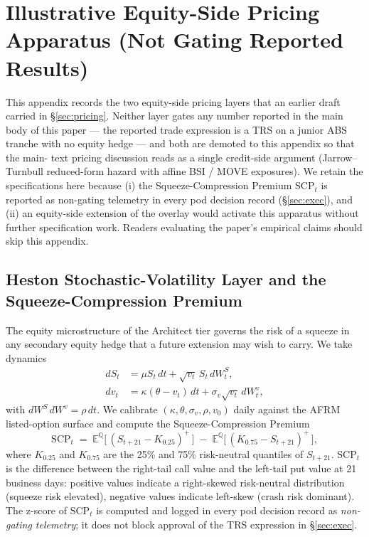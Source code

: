 \documentclass[11pt,letterpaper]{article}
\newcommand{\scp}{\text{SCP}}
\begin{document}
\section{Illustrative Equity-Side Pricing Apparatus (Not Gating Reported Results)}
\label{app:pricing-equity}

This appendix records the two equity-side pricing layers that an
earlier draft carried in \S\ref{sec:pricing}. Neither layer gates
any number reported in the main body of this paper --- the reported
trade expression is a TRS on a junior ABS tranche with no equity
hedge --- and both are demoted to this appendix so that the main-
text pricing discussion reads as a single credit-side argument
(Jarrow--Turnbull reduced-form hazard with affine BSI / MOVE
exposures). We retain the specifications here because (i) the
Squeeze-Compression Premium $\scp_t$ is reported as non-gating
telemetry in every pod decision record (\S\ref{sec:exec}), and (ii)
an equity-side extension of the overlay would activate this
apparatus without further specification work. Readers evaluating
the paper's empirical claims should skip this appendix.

\subsection{Heston Stochastic-Volatility Layer and the Squeeze-Compression Premium}
\label{app:heston}

The equity microstructure of the Architect tier governs the risk of
a squeeze in any secondary equity hedge that a future extension may
wish to carry. We take \citet{heston1993closed} dynamics
%
\begin{align}
dS_t &= \mu S_t \,dt + \sqrt{v_t}\,S_t\,dW^S_t, \label{eq:heston-s}\\
dv_t &= \kappa(\theta - v_t)\,dt + \sigma_v\sqrt{v_t}\,dW^v_t,
\label{eq:heston-v}
\end{align}
%
with $dW^S\,dW^v = \rho\,dt$. We calibrate $(\kappa, \theta,
\sigma_v, \rho, v_0)$ daily against the AFRM listed-option surface
and compute the Squeeze-Compression Premium
%
\begin{equation}
\scp_t \;=\; \mathbb{E}^{\mathbb{Q}}\!\bigl[\,(S_{t+21} - K_{0.25})^+\,\bigr]
\;-\;
\mathbb{E}^{\mathbb{Q}}\!\bigl[\,(K_{0.75} - S_{t+21})^+\,\bigr],
\label{eq:scp}
\end{equation}
%
where $K_{0.25}$ and $K_{0.75}$ are the 25\% and 75\% risk-neutral
quantiles of $S_{t+21}$. $\scp_t$ is the difference between the
right-tail call value and the left-tail put value at 21 business
days: positive values indicate a right-skewed risk-neutral
distribution (squeeze risk elevated), negative values indicate
left-skew (crash risk dominant). The z-score of $\scp_t$ is
computed and logged in every pod decision record as
\emph{non-gating telemetry}; it does not block approval of the
TRS expression in \S\ref{sec:exec}.
\end{document}
